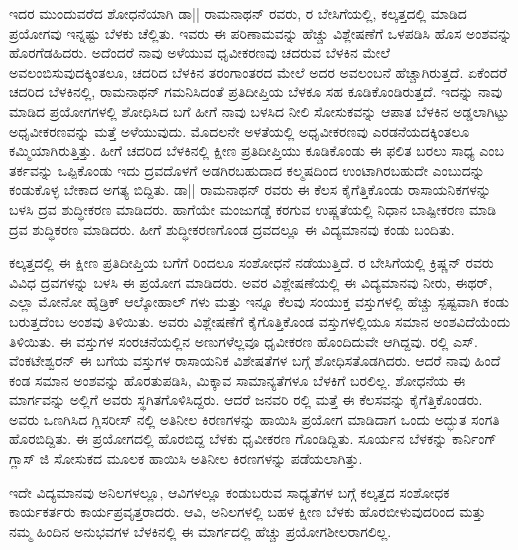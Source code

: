 ಇದರ ಮುಂದುವರೆದ ಶೋಧನೆಯಾಗಿ ಡಾ|| ರಾಮನಾಥನ್ ರವರು, ರ ಬೇಸಿಗೆಯಲ್ಲಿ, ಕಲ್ಕತ್ತದಲ್ಲಿ ಮಾಡಿದ ಪ್ರಯೋಗವು ಇನ್ನಷ್ಟು ಬೆಳಕು ಚೆಲ್ಲಿತು. ಇವರು ಈ ಪರಿಣಾಮವನ್ನು ಹೆಚ್ಚು ವಿಶ್ಲೇಷಣೆಗೆ ಒಳಪಡಿಸಿ ಹೊಸ ಅಂಶವನ್ನು ಹೊರಗೆಡಹಿದರು. ಅದೆಂದರೆ ನಾವು ಅಳೆಯುವ ಧೃವೀಕರಣವು ಚದರುವ ಬೆಳಕಿನ ಮೇಲೆ ಅವಲಂಬಿಸುವುದಕ್ಕಿಂತಲೂ, ಚದರಿದ ಬೆಳಕಿನ ತರಂಗಾಂತರದ ಮೇಲೆ ಅದರ ಅವಲಂಬನೆ ಹೆಚ್ಚಾಗಿರುತ್ತದೆ. ಏಕೆಂದರೆ ಚದರಿದ ಬೆಳಕಿನಲ್ಲಿ, ರಾಮನಾಥನ್ ಗಮನಿಸಿದಂತೆ ಪ್ರತಿದೀಪ್ತಿಯ ಬೆಳಕೂ ಸಹ ಕೂಡಿಕೊಂಡಿರುತ್ತದೆ. ಇದನ್ನು ನಾವು ಮಾಡಿದ ಪ್ರಯೋಗಗಳಲ್ಲಿ ಶೋಧಿಸಿದ ಬಗೆ ಹೀಗೆ \enginline{-} ನಾವು ಬಳಸಿದ ನೀಲಿ ಸೋಸುಕವನ್ನು ಆಪಾತ ಬೆಳಕಿನ ಅಡ್ಡಲಾಗಿಟ್ಟು ಅಧೃವೀಕರಣವನ್ನು ಮತ್ತೆ ಅಳೆಯುವುದು. ಮೊದಲನೇ ಅಳತೆಯಲ್ಲಿ ಅಧೃವೀಕರಣವು ಎರಡನೆಯದಕ್ಕಿಂತಲೂ ಕಮ್ಮಿಯಾಗಿರುತ್ತಿತ್ತು. ಹೀಗೆ ಚದರಿದ ಬೆಳಕಿನಲ್ಲಿ ಕ್ಷೀಣ ಪ್ರತಿದೀಪ್ತಿಯು ಕೂಡಿಕೊಂಡು ಈ ಫಲಿತ ಬರಲು ಸಾಧ್ಯ ಎಂಬ ತರ್ಕವನ್ನು ಒಪ್ಪಿಕೊಂಡು ಇದು ದ್ರವದೊಳಗೆ ಅಡಗಿರಬಹುದಾದ ಕಲ್ಮಷದಿಂದ ಉಂಟಾಗಿರಬಹುದೇ ಎಂಬುದನ್ನು ಕಂಡುಕೊಳ್ಳ ಬೇಕಾದ ಅಗತ್ಯ ಬಿದ್ದಿತು. ಡಾ|| ರಾಮನಾಥನ್ ರವರು ಈ ಕೆಲಸ ಕೈಗೆತ್ತಿಕೊಂಡು ರಾಸಾಯನಿಕಗಳನ್ನು ಬಳಸಿ ದ್ರವ ಶುದ್ಧೀಕರಣ ಮಾಡಿದರು. ಹಾಗೆಯೇ ಮಂಜುಗಡ್ಡೆ ಕರಗುವ ಉಷ್ಣತೆಯಲ್ಲಿ ನಿಧಾನ ಬಾಷ್ಪೀಕರಣ ಮಾಡಿ ದ್ರವ ಶುದ್ಧಿಕರಣ ಮಾಡಿದರು. ಹೀಗೆ ಶುದ್ಧೀಕರಣಗೊಂಡ ದ್ರವದಲ್ಲೂ ಈ ವಿದ್ಯಮಾನವು ಕಂಡು ಬಂದಿತು.

ಕಲ್ಕತ್ತದಲ್ಲಿ ಈ ಕ್ಷೀಣ ಪ್ರತಿದೀಪ್ತಿಯ ಬಗೆಗೆ  ರಿಂದಲೂ ಸಂಶೋಧನೆ ನಡೆಯುತ್ತಿದೆ. ರ ಬೇಸಿಗೆಯಲ್ಲಿ ಕ್ರಿಷ್ಣನ್ ರವರು  ವಿವಿಧ ದ್ರವಗಳನ್ನು ಬಳಸಿ ಈ ಪ್ರಯೋಗ ಮಾಡಿದರು. ಅವರ ವಿಶ್ಲೇಷಣೆಯಲ್ಲಿ ಈ ವಿದ್ಯಮಾನವು ನೀರು, ಈಥರ್, ಎಲ್ಲಾ ಮೋನೋ ಹೈಡ್ರಿಕ್ ಆಲ್ಕೋಹಾಲ್ ಗಳು ಮತ್ತು ಇನ್ನೂ ಕೆಲವು ಸಂಯುಕ್ತ ವಸ್ತುಗಳಲ್ಲಿ ಹೆಚ್ಚು ಸ್ಪಷ್ಟವಾಗಿ ಕಂಡು ಬರುತ್ತದೆಂಬ ಅಂಶವು ತಿಳಿಯಿತು. ಅವರು ವಿಶ್ಲೇಷಣೆಗೆ ಕೈಗೊತ್ತಿಕೊಂಡ ವಸ್ತುಗಳಲ್ಲಿಯೂ ಸಮಾನ ಅಂಶವಿದೆಯೆಂದು ತಿಳಿಯಿತು. ಈ ವಸ್ತುಗಳ ಸಂರಚನೆಯಲ್ಲಿನ ಅಣುಗಳೆಲ್ಲವೂ ಧೃವೀಕರಣ ಹೊಂದಿದುವೇ ಆಗಿದ್ದವು. ರಲ್ಲಿ ಎಸ್. ವೆಂಕಟೇಶ್ವರನ್ ಈ ಬಗೆಯ ವಸ್ತುಗಳ ರಾಸಾಯನಿಕ ವಿಶೇಷತೆಗಳ ಬಗ್ಗೆ ಶೋಧಿಸತೊಡಗಿದರು. ಆದರೆ ನಾವು ಹಿಂದೆ ಕಂಡ ಸಮಾನ ಅಂಶವನ್ನು ಹೊರತುಪಡಿಸಿ, ಮಿಕ್ಕಾವ ಸಾಮಾನ್ಯತೆಗಳೂ ಬೆಳಕಿಗೆ ಬರಲಿಲ್ಲ. ಶೋಧನೆಯ ಈ ಮಾರ್ಗವನ್ನು ಅಲ್ಲಿಗೆ ಅವರು ಸ್ಥಗಿತಗೊಳಿಸಿದ್ದರು. ಆದರೆ ಜನವರಿ ರಲ್ಲಿ ಮತ್ತೆ ಈ ಕೆಲಸವನ್ನು ಕೈಗೆತ್ತಿಕೊಂಡರು. ಅವರು ಒಣಗಿಸಿದ ಗ್ಲಿಸರೀಸ್ ನಲ್ಲಿ ಅತಿನೀಲ ಕಿರಣಗಳನ್ನು ಹಾಯಿಸಿ ಪ್ರಯೋಗ ಮಾಡಿದಾಗ ಒಂದು ಅದ್ಭುತ ಸಂಗತಿ ಹೊರಬಿದ್ದಿತು. ಈ ಪ್ರಯೋಗದಲ್ಲಿ ಹೊರಬಿದ್ದ ಬೆಳಕು ಧೃವೀಕರಣ ಗೊಂಡಿದ್ದಿತು. ಸೂರ್ಯನ ಬೆಳಕನ್ನು ಕಾರ್ನಿಂಗ್ ಗ್ಲಾಸ್ ಜಿ\enginline{-} ಸೋಸುಕದ ಮೂಲಕ ಹಾಯಿಸಿ ಅತಿನೀಲ ಕಿರಣಗಳನ್ನು ಪಡೆಯಲಾಗಿತ್ತು.

ಇದೇ ವಿದ್ಯಮಾನವು ಅನಿಲಗಳಲ್ಲೂ, ಆವಿಗಳಲ್ಲೂ ಕಂಡುಬರುವ ಸಾಧ್ಯತೆಗಳ ಬಗ್ಗೆ ಕಲ್ಕತ್ತದ ಸಂಶೋಧಕ ಕಾರ್ಯಕರ್ತರು ಕಾರ್ಯಪ್ರವೃತ್ತರಾದರು. ಆವಿ, ಅನಿಲಗಳಲ್ಲಿ ಬಹಳ ಕ್ಷೀಣ ಬೆಳಕು ಹೊರಬೀಳುವುದರಿಂದ ಮತ್ತು ನಮ್ಮ ಹಿಂದಿನ ಅನುಭವಗಳ ಬೆಳಕಿನಲ್ಲಿ ಈ ಮಾರ್ಗದಲ್ಲಿ ಹೆಚ್ಚು ಪ್ರಯೋಗಶೀಲರಾಗಲಿಲ್ಲ.



